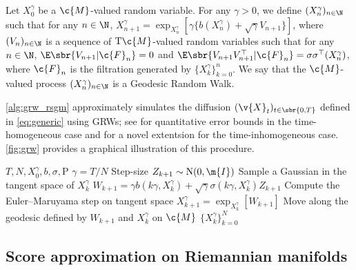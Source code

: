 \begin{definition}
	Let $X^\gamma_0$ be a $\c{M}$-valued random variable.
	For any $\gamma > 0$, we define $(X_n^\gamma)_{n \in \N}$ such that for any $n \in \N$, $X_{n+1}^\gamma = \exp_{X_{n}^\gamma}[\gamma \{ b(X_{n}^\gamma) + \sqrt{\gamma} V_{n+1} \}]$, where $(V_n)_{n \in \N}$ is a sequence of $\mathrm{T}\c{M}$-valued random variables such that for any $n \in \N$, $\E\sbr{V_{n+1}|\c{F}_n} = 0$ and $\E\sbr{V_{n+1} V_{n+1}^\top | \c{F}_n} = \sigma \sigma^\top(X_n^\gamma)$, where $\c{F}_n$ is the filtration generated by $\{X_k^\gamma\}_{k=0}^n$.
	We say that the $\c{M}$-valued process $(X_n^\gamma)_{n \in \N}$ is a Geodesic Random Walk.
\end{definition}

\cref{alg:grw_rsgm} approximately simulates the diffusion
$(\v{X}_t)_{t \in \sbr{0,T}}$ defined in \cref{eq:generic} using GRWs; see \textcite{kuwada2012convergence,cheng2022theorymanifold} for quantitative error bounds in the time-homogeneous
case and  for a novel extentsion for the time-inhomogeneous case. \cref{fig:grw} provides a graphical illustration of this procedure.

\begin{algorithm}[!t]
	\caption{\small GRW (Geodesic Random Walk)}
	\label{alg:grw_rsgm}
	\begin{algorithmic}[1]
		\small
		\Require $T, N, X_0^\gamma, b, \sigma, \mathrm{P}$
		\State $\gamma = T / N$ \Comment Step-size
		\State $Z_{k+1} \sim \mathrm{N}(0, \m{I})$ \Comment Sample a Gaussian in the tangent space of $X_{k}^\gamma$
		\State $W_{k+1} = \gamma b(k \gamma, X_k^\gamma) + \sqrt{\gamma} \sigma(k \gamma, X_k^\gamma) Z_{k+1}$ \Comment Compute the Euler--Maruyama step on tangent space
		\State $X_{k+1}^\gamma = \exp_{X_k^\gamma}[W_{k+1}]$ \Comment Move along the geodesic defined by $W_{k+1}$ and $X_{k}^\gamma$ on $\c{M}$
		\EndFor
		 $\{ X_k^\gamma\}_{k=0}^{N}$
	\end{algorithmic}
\end{algorithm}

\subsection{Score approximation on Riemannian manifolds}
\label{sec:riem-score-appr}
